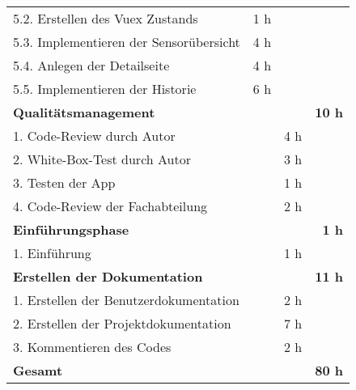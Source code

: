 \begin{tabularx}{\textwidth}{Xrrr}
5.2. Erstellen des Vuex Zustands & 1 h   &       &  \\
\rowcolor{odd}5.3. Implementieren der Sensorübersicht & 4 h   &       &  \\
5.4. Anlegen der Detailseite & 4 h   &       &  \\
\rowcolor{odd}5.5. Implementieren der Historie & 6 h   &       &  \\
\rowcolor{heading}\textbf{Qualitätsmanagement} & \textbf{} & \textbf{} & \textbf{10 h} \\
1. Code-Review durch Autor &       & 4 h   &  \\
\rowcolor{odd}2. White-Box-Test durch Autor &       & 3 h   &  \\
3. Testen der App &       & 1 h   &  \\
\rowcolor{odd}4. Code-Review der Fachabteilung &       & 2 h   &  \\
\rowcolor{heading}\textbf{Einführungsphase} & \textbf{} & \textbf{} & \textbf{1 h} \\
1. Einführung &       & 1 h   &  \\
\rowcolor{heading}\textbf{Erstellen der Dokumentation} & \textbf{} & \textbf{} & \textbf{11 h} \\
1. Erstellen der Benutzerdokumentation &       & 2 h   &  \\
\rowcolor{odd}2. Erstellen der Projektdokumentation &       & 7 h   &  \\
3. Kommentieren des Codes &       & 2 h   &  \\
\hline
\hline
\rowcolor{heading}\textbf{Gesamt} & \textbf{} & \textbf{} & \textbf{80 h} \\
\end{tabularx}
